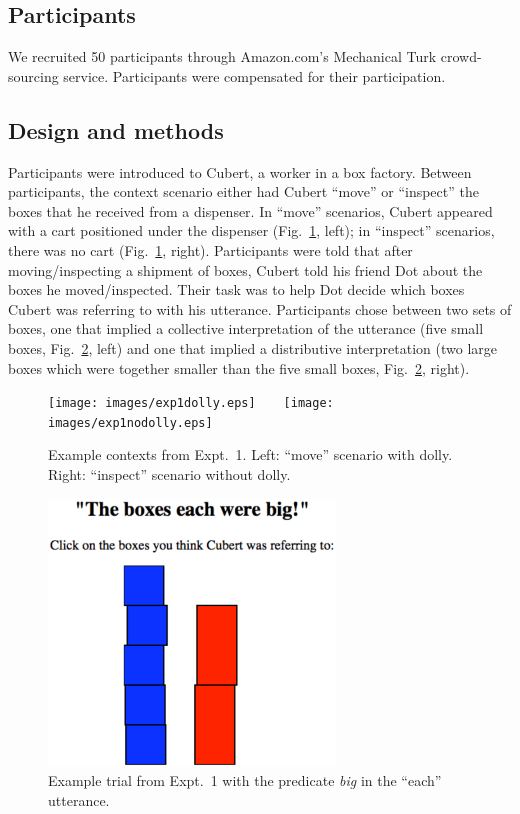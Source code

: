 \documentclass[linguex]{sp}
\begin{document}
\subsection{Participants}

We recruited 50 participants through Amazon.com's Mechanical Turk crowd-sourcing service. Participants were compensated for their participation.


\subsection{Design and methods}

Participants were introduced to Cubert, a worker in a box factory. Between participants, the context scenario either had Cubert ``move'' or ``inspect'' the boxes that he received from a dispenser. In ``move'' scenarios, Cubert appeared with a cart positioned under the dispenser (Fig.~\ref{expt1context}, left); in ``inspect'' scenarios, there was no cart (Fig.~\ref{expt1context}, right). Participants were told that after moving/inspecting a shipment of boxes, Cubert told his friend Dot about the boxes he moved/inspected. Their task was to help Dot decide which boxes Cubert was referring to with his utterance. Participants chose between two sets of boxes, one that implied a collective interpretation of the utterance (five small boxes, Fig.\ \ref{expt1trial}, left) and one that implied a distributive interpretation (two large boxes which were together smaller than the five small boxes, Fig.\ \ref{expt1trial}, right).

\begin{figure}[h]
	\centering
	\texttt{[image: images/exp1dolly.eps]}\ \ \ \ 
	\texttt{[image: images/exp1nodolly.eps]}
	\caption{Example contexts from Expt.~1. Left: ``move'' scenario with dolly. Right: ``inspect'' scenario without dolly.}\label{expt1context}
\end{figure}

\begin{figure}[h]
	\centering
	\includegraphics[width=3in]{images/trial2.eps}
	\caption{Example trial from Expt.~1 with the predicate \emph{big} in the ``each'' utterance.}\label{expt1trial}
\end{figure}
\end{document}
